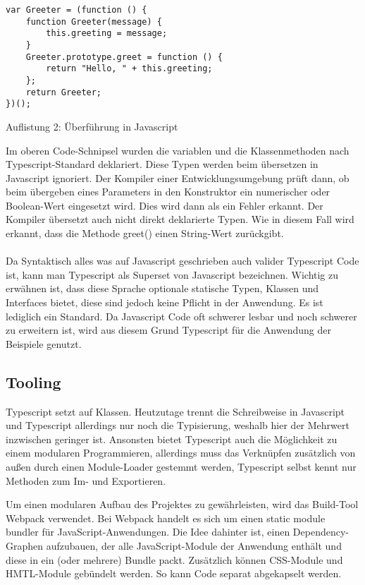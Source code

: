 \begin{lstlisting}
var Greeter = (function () {
    function Greeter(message) {
        this.greeting = message;
    }
    Greeter.prototype.greet = function () {
        return "Hello, " + this.greeting;
    };
    return Greeter;
})(); 
\end{lstlisting}

\begin{center}
    \large{Auflistung 2: Überführung in Javascript}
\end{center}

Im oberen Code-Schnipsel wurden die variablen und die Klassenmethoden nach Typescript-Standard deklariert. Diese Typen werden beim übersetzen in Javascript ignoriert. Der Kompiler einer Entwicklungsumgebung prüft dann, ob beim übergeben eines Parameters in den Konstruktor ein numerischer oder Boolean-Wert eingesetzt wird. Dies wird dann als ein Fehler erkannt. Der Kompiler übersetzt auch nicht direkt deklarierte Typen. Wie in diesem Fall wird erkannt, dass die Methode greet() einen String-Wert zurückgibt.
\\
\\
Da Syntaktisch alles was auf Javascript geschrieben auch valider Typescript Code ist, kann man Typescript als Superset von Javascript bezeichnen.
Wichtig zu erwähnen ist, dass diese Sprache optionale statische Typen, Klassen und Interfaces bietet, diese sind jedoch keine Pflicht in der Anwendung. Es ist lediglich ein Standard.
Da Javascript Code oft schwerer lesbar und noch schwerer zu erweitern ist, wird aus diesem Grund Typescript für die Anwendung der Beispiele genutzt.

\subsection{Tooling}

Typescript setzt auf Klassen. Heutzutage trennt die Schreibweise in Javascript und Typescript allerdings nur noch die Typisierung, weshalb hier der Mehrwert inzwischen geringer ist. Ansonsten bietet Typescript auch die Möglichkeit zu einem modularen Programmieren, allerdings muss das Verknüpfen zusätzlich von außen durch einen Module-Loader gestemmt werden, Typescript selbst kennt nur Methoden zum Im- und Exportieren.

Um einen modularen Aufbau des Projektes zu gewährleisten, wird das Build-Tool \glqq{}Webpack\grqq{} verwendet. Bei Webpack handelt es sich um einen \glqq{}static module bundler\grqq{} für JavaScript-Anwendungen. Die Idee dahinter ist, einen Dependency-Graphen aufzubauen, der alle JavaScript-Module der Anwendung enthält und diese in ein (oder mehrere) Bundle packt. Zusätzlich können CSS-Module und HMTL-Module gebündelt werden. So kann Code separat abgekapselt werden.\cite{Webpack-basics}

